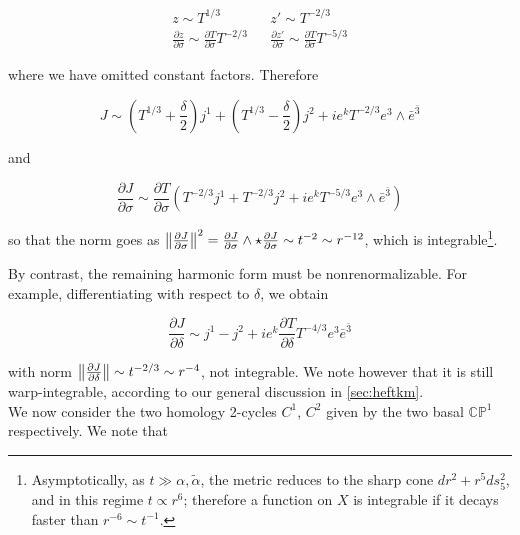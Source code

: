 \begin{align}
	z \sim T^{1/3} && z' \sim T^{-2/3}\\	
	\frac{\partial z}{\partial \sigma} \sim \frac{\partial T}{\partial \sigma} T^{-2/3} && \frac{\partial z'}{\partial \sigma} \sim \frac{\partial T}{\partial \sigma} T^{-5/3}
\end{align}

where we have omitted constant factors. Therefore

\begin{equation}
	J \sim \left(T^{1/3} + \frac{\delta}{2}\right) j^1 + \left(T^{1/3} - \frac{\delta}{2}\right)j^2 + ie^k T^{-2/3} e^3 \wedge \bar e^{\bar 3}
	\label{}
\end{equation}

and

\begin{equation}
	\frac{\partial J}{\partial \sigma} \sim \frac{\partial T}{\partial \sigma}\left( T^{-2/3} j^1 + T^{-2/3} j^2 + i e^k T^{-5/3}e^3 \wedge \bar e^{\bar 3} \right)
	\label{}
\end{equation}


so that the norm goes as $\left\Vert \frac{\partial J}{\partial\sigma} \right\Vert^2 = \frac{\partial J}{\partial\sigma} \wedge \star \frac{\partial J}{\partial\sigma} \sim t^{-2} \sim r^{-12}$, which is integrable\footnote{Asymptotically, as $t\gg \alpha,\tilde{\alpha}$, the metric reduces to the sharp cone $dr^2 + r^5 ds_5^2$, and in this regime $t \propto r^6$; therefore a function on $X$ is integrable if it decays faster than $r^{-6} \sim t^{-1}$.}.

By contrast, the remaining harmonic form must be nonrenormalizable. For example, differentiating with respect to $\delta$, we obtain

\begin{equation}
	\frac{\partial J}{\partial \delta} \sim j^1 - j^2 + ie^k \frac{\partial T}{\partial \delta} T^{-4/3} e^3 \bar e^{\bar 3}
	\label{}
\end{equation}

with norm $ \left\Vert \frac{\partial J}{\partial\delta} \right\Vert \sim t^{-2/3} \sim r^{-4}$, not integrable. We note however that it is still warp-integrable, according to our general discussion in \ref{sec:heftkm}.\\

We now consider the two homology 2-cycles $C^1$, $C^2$ given by the two basal $\mathbb{CP}^1$ respectively. We note that

